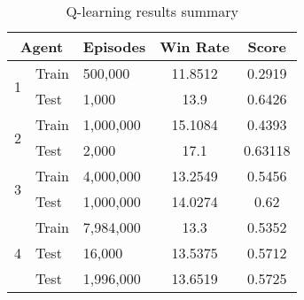 \begin{table}[H]
  \centering
  \begin{tabular}[t]{| l | l | l | c | c |}
    \hline
    \multicolumn{2}{|c|}{\textbf{Agent}} & \textbf{Episodes} & \textbf{Win Rate} & \textbf{Score} \\
    \hline
    \multirow{2}{*}{1} & Train & 500,000 & 11.8512 & 0.2919 \\
    & Test & 1,000 & 13.9 & 0.6426 \\
    \hline
    \multirow{2}{*}{2} & Train & 1,000,000 & 15.1084 & 0.4393 \\
    & Test & 2,000 & 17.1 & 0.63118 \\
    \hline
    \multirow{2}{*}{3} & Train & 4,000,000 & 13.2549 & 0.5456 \\
    & Test & 1,000,000 & 14.0274 & 0.62 \\
    \hline
    \multirow{3}{*}{4} & Train & 7,984,000 & 13.3 & 0.5352 \\
    & Test & 16,000 & 13.5375 & 0.5712 \\
    & Test & 1,996,000 & 13.6519 & 0.5725 \\
    \hline
  \end{tabular}
  \caption{Q-learning results summary}
\end{table}

